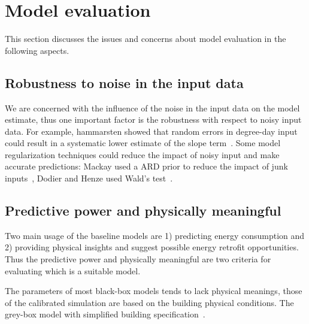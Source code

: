 \documentclass[12pt]{article}
\begin{document}
\section{Model evaluation}
This section discusses the issues and concerns about model evaluation
in the following aspects.
\subsection{Robustness to noise in the input data}
We are concerned with the influence of the noise in the input data on
the model estimate, thus one important factor is the robustness with
respect to noisy input data. For example, hammarsten showed that
random errors in degree-day input could result in a systematic lower
estimate of the slope term~\cite{hammarsten1987critical}. Some model
regularization techniques could reduce the impact of noisy input and
make accurate predictions: Mackay used a ARD prior to reduce the
impact of junk inputs~\cite{mackay1996bayesian}, Dodier
and Henze used Wald's test~\cite{dodier2004statistical}.

\subsection{Predictive power and physically meaningful}
Two main usage of the baseline models are 1) predicting energy
consumption and 2) providing physical insights and suggest possible
energy retrofit opportunities. Thus the predictive power and
physically meaningful are two criteria for evaluating which is a
suitable model.

The parameters of most black-box models tends to lack physical
meanings, those of the calibrated simulation are based on the building
physical conditions. The grey-box model with simplified building
specification~\cite{brown2012kernel}.
\end{document}
